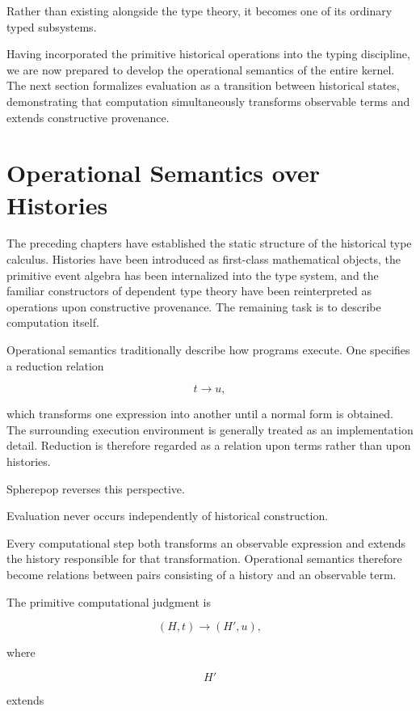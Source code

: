 \documentclass[12pt,oneside]{article}
\theoremstyle{definition}
\theoremstyle{remark}
\begin{document}
Rather than existing alongside the type theory, it becomes one of its ordinary
typed subsystems.

Having incorporated the primitive historical operations into the typing
discipline, we are now prepared to develop the operational semantics of the
entire kernel. The next section formalizes evaluation as a transition between
historical states, demonstrating that computation simultaneously transforms
observable terms and extends constructive provenance.

\section{Operational Semantics over Histories}

The preceding chapters have established the static structure of the historical
type calculus. Histories have been introduced as first-class mathematical
objects, the primitive event algebra has been internalized into the type
system, and the familiar constructors of dependent type theory have been
reinterpreted as operations upon constructive provenance. The remaining task is
to describe computation itself.

Operational semantics traditionally describe how programs execute. One specifies
a reduction relation

\[
t
\longrightarrow
u,
\]

which transforms one expression into another until a normal form is obtained.
The surrounding execution environment is generally treated as an implementation
detail. Reduction is therefore regarded as a relation upon terms rather than
upon histories.

Spherepop reverses this perspective.

Evaluation never occurs independently of historical construction.

Every computational step both transforms an observable expression and extends
the history responsible for that transformation. Operational semantics
therefore become relations between pairs consisting of a history and an
observable term.

The primitive computational judgment is

\[
(H,t)
\longrightarrow
(H',u),
\]

where

\[
H'
\]

extends
\end{document}
